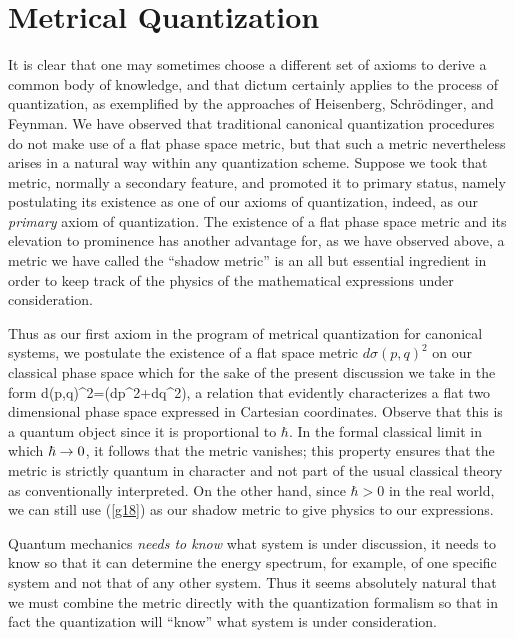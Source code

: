\section{Metrical Quantization}
It is clear that one may sometimes choose a different set of axioms to 
derive a common body of knowledge, and that dictum certainly applies to 
the process of quantization, as exemplified by the approaches of 
Heisenberg, Schr\"odinger, and Feynman. We have observed that 
traditional canonical quantization procedures do not make use of a flat 
phase space metric, but that such a metric nevertheless arises in a 
natural way within any quantization scheme. Suppose we took that metric, 
normally a secondary feature, and promoted it to primary status, namely 
postulating its existence as one of our axioms of quantization, indeed, 
as our {\it primary} axiom of quantization. The existence of a flat phase 
space metric and its elevation to prominence has another advantage for, 
as we have observed above, a metric we have called the ``shadow metric'' 
is an all but essential ingredient in order to keep track of the physics 
of the mathematical expressions under consideration. 

Thus as our first axiom in the program of metrical quantization for 
canonical systems, we postulate the existence of a flat space metric 
$d\sigma(p,q)^2$ on our classical phase space which for the sake of the 
present discussion we take in the form
  \bn  d\sigma(p,q)^2=\hbar(dp^2+dq^2)\;,  \label{g18}\en
a relation that evidently characterizes a flat two dimensional phase 
space expressed in Cartesian coordinates.
Observe that this is a quantum object since it is proportional to $\hbar$. 
In the formal classical limit in which $\hbar\rightarrow0$, it follows that the 
metric vanishes; this property ensures that the metric is strictly quantum 
in character and not part of the usual classical theory as conventionally 
interpreted. On the other hand, since $\hbar>0$ in the real world, 
we can still use (\ref{g18}) as our shadow metric to give physics to our 
expressions. 

Quantum mechanics {\it needs to know} what system is under discussion, it 
needs to know so that it can determine the energy spectrum, for example, 
of one specific system and not that of any other system. Thus it seems 
absolutely natural that we must combine the metric directly with the 
quantization formalism so that in fact the quantization will ``know'' 
what system is under consideration. 

